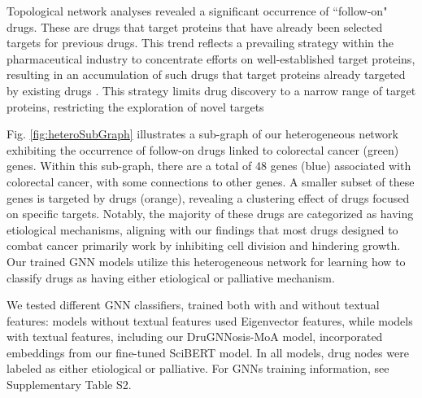 \documentclass[journal,twoside,web]{ieeecolor}
\begin{document}
Topological network analyses revealed a significant occurrence of ``follow-on" drugs.
These are drugs that target proteins that have already been selected targets for previous drugs.
This trend reflects a prevailing strategy within the pharmaceutical industry to concentrate efforts on well-established target proteins, resulting in an accumulation of such drugs that target proteins already targeted by existing drugs \cite{aronson2020me}.
This strategy limits drug discovery to a narrow range of target proteins, restricting the exploration of novel targets

Fig. \ref{fig:heteroSubGraph} illustrates a sub-graph of our heterogeneous network exhibiting the occurrence of follow-on drugs linked to colorectal cancer (green) genes.
Within this sub-graph, there are a total of 48 genes (blue) associated with colorectal cancer, with some connections to other genes.
A smaller subset of these genes is targeted by drugs (orange), revealing a clustering effect of drugs focused on specific targets.
Notably, the majority of these drugs are categorized as having etiological mechanisms, aligning with our findings that most drugs designed to combat cancer primarily work by inhibiting cell division and hindering growth.
Our trained GNN models utilize this heterogeneous network for learning how to classify drugs as having either etiological or palliative mechanism.

We tested different GNN classifiers, trained both with and without textual features: models without textual features used Eigenvector features, while models with textual features, including our DruGNNosis-MoA model, incorporated embeddings from our fine-tuned SciBERT model.
In all models, drug nodes were labeled as either etiological or palliative.
For GNNs training information, see Supplementary Table S2. 
\end{document}
